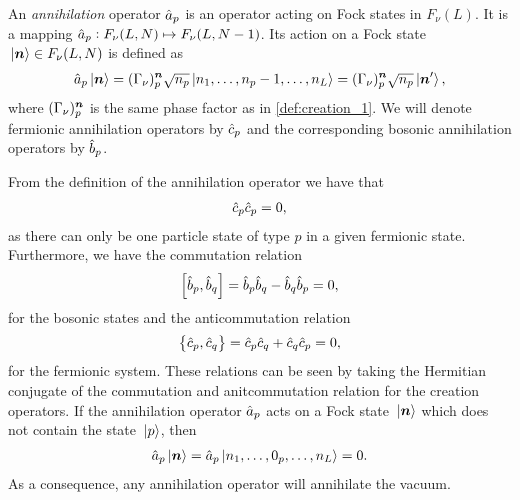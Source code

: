             \begin{definition}
                \label{def:annihilation_1}
                An \emph{annihilation} operator $\hat{a}_{p}$ is an operator acting
                on Fock states in $F_{\nu}(L)$.
                It is a mapping $\hat{a}_{p}: F_{\nu}(L, N) \mapsto F_{\nu}(L, N -
                1)$.
                Its action on a Fock state $\ket*{\boldsymbol{n}} \in F_{\nu}(L, N)$ is
                defined as
                \begin{align}
                    \hat{a}_{p}\ket*{\boldsymbol{n}}
                    = (\Gamma_{\nu})^{\boldsymbol{n}}_{p}
                    \sqrt{n_p}
                    \ket*{n_1, \dots, n_p - 1, \dots, n_L}
                    = (\Gamma_{\nu})^{\boldsymbol{n}}_{p}
                    \sqrt{n_p}
                    \ket*{\boldsymbol{n}'},
                \end{align}
                where $(\Gamma_{\nu})^{\boldsymbol{n}}_{p}$ is the same phase factor as
                in \autoref{def:creation_1}.
                We will denote fermionic annihilation operators by $\hat{c}_{p}$ and
                the corresponding bosonic annihilation operators by $\hat{b}_{p}$.
            \end{definition}
            From the definition of the annihilation operator we have that
            \begin{align}
                \hat{c}_{p}\hat{c}_{p} = 0,
            \end{align}
            as there can only be one particle state of type $p$ in a given
            fermionic state.
            Furthermore, we have the commutation relation
            \begin{align}
                \left[\hat{b}_{p}, \hat{b}_{q}\right] = \hat{b}_{p}\hat{b}_{q} - \hat{b}_{q}\hat{b}_{p} = 0,
            \end{align}
            for the bosonic states and the anticommutation relation
            \begin{align}
                \left\{\hat{c}_{p}, \hat{c}_{q}\right\} = \hat{c}_{p}\hat{c}_{q} + \hat{c}_{q}\hat{c}_{p} = 0,
            \end{align}
            for the fermionic system.
            These relations can be seen by taking the Hermitian conjugate of the
            commutation and anitcommutation relation for the creation operators.
            If the annihilation operator $\hat{a}_{p}$ acts on a Fock state
            $\ket*{\boldsymbol{n}}$ which does not contain the state $\ket*{p}$, then
            \begin{align}
                \hat{a}_{p}\ket*{\boldsymbol{n}}
                = \hat{a}_{p}\ket*{n_1, \dots, 0_p, \dots, n_L}
                = 0.
            \end{align}
            As a consequence, any annihilation operator will annihilate the
            vacuum.

